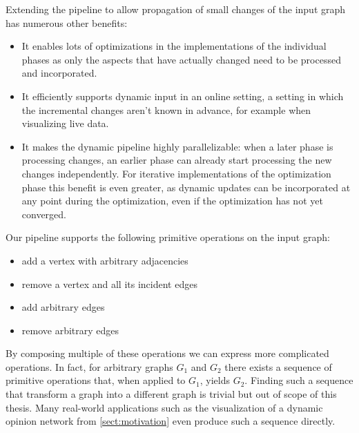 


Extending the pipeline to allow propagation of small changes of the input graph has numerous other benefits:
%
\begin{itemize}
	\item It enables lots of optimizations in the implementations of the individual phases as only the aspects that have actually changed need to be processed and incorporated.
	\item It efficiently supports dynamic input in an online setting, \ie{} a setting in which the incremental changes aren't known in advance, for example when visualizing live data.
	\item It makes the dynamic pipeline highly parallelizable: when a later phase is processing changes, an earlier phase can already start processing the new changes independently. For iterative implementations of the optimization phase this benefit is even greater, as dynamic updates can be incorporated at any point during the optimization, even if the optimization has not yet converged.
\end{itemize}


Our pipeline supports the following primitive operations on the input graph:
%
\begin{itemize}
	\setlength\itemsep{-0.5em}
	\item add a vertex with arbitrary adjacencies
	\item remove a vertex and all its incident edges
	\item add arbitrary edges
	\item remove arbitrary edges
\end{itemize}
%
By composing multiple of these operations we can express more complicated operations. In fact, for arbitrary graphs $G_1$ and $G_2$ there exists a sequence of primitive operations that, when applied to $G_1$, yields $G_2$. Finding such a sequence that transform a graph into a different graph is trivial but out of scope of this thesis. Many real-world applications such as the visualization of a dynamic opinion network from \cref{sect:motivation} even produce such a sequence directly.

\clearpage

\clearpage

\clearpage

